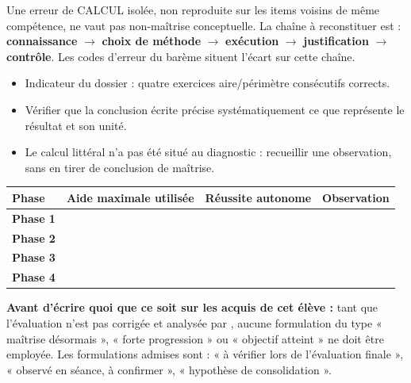 \documentclass[10pt,a4paper]{article}
\begin{document}
Une erreur de \textsc{CALCUL} isolée, non reproduite sur les items voisins de même compétence, ne vaut pas non-maîtrise conceptuelle. La chaîne à reconstituer est : \textbf{connaissance} $\rightarrow$ \textbf{choix de méthode} $\rightarrow$ \textbf{exécution} $\rightarrow$ \textbf{justification} $\rightarrow$ \textbf{contrôle}. Les codes d'erreur du barème situent l'écart sur cette chaîne.
\begin{itemize}\item Indicateur du dossier : quatre exercices aire/périmètre consécutifs corrects.\item Vérifier que la conclusion écrite précise systématiquement ce que représente le résultat et son unité.\item Le calcul littéral n'a pas été situé au diagnostic : recueillir une observation, sans en tirer de conclusion de maîtrise.\end{itemize}
\par\noindent\begin{tabularx}{\linewidth}{>{\bfseries}p{26mm} X X X}
\toprule Phase & Aide maximale utilisée & Réussite autonome & Observation \\ \midrule
Phase 1 & & & \\[6mm]
Phase 2 & & & \\[6mm]
Phase 3 & & & \\[6mm]
Phase 4 & & & \\[6mm]
\bottomrule\end{tabularx}
\begin{warningbox}\textbf{Avant d'écrire quoi que ce soit sur les acquis de cet élève :} tant que l'évaluation n'est pas corrigée et analysée par , aucune formulation du type « maîtrise désormais », « forte progression » ou « objectif atteint » ne doit être employée. Les formulations admises sont : « à vérifier lors de l'évaluation finale », « observé en séance, à confirmer », « hypothèse de consolidation ».\end{warningbox}
\end{document}
